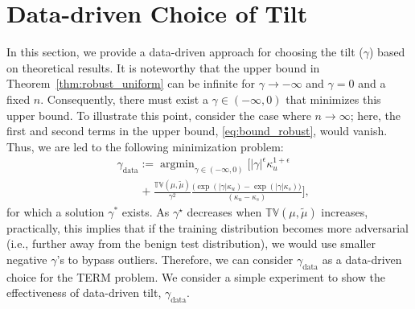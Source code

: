 \documentclass{article}
\theoremstyle{plain}
\theoremstyle{plain}
\theoremstyle{definition}
\theoremstyle{remark}
\newcommand{\todoa}[2][]{\todo[size=tiny,color=blue!20!white,#1]{GA: #2}\xspace}
\newcommand{\todor}[2][]{\todo[size=tiny,color=orange!20!white,#1]{GR: #2}\xspace}
\begin{document}
\section{Data-driven Choice of Tilt}\label{sec:Experiment}
In this section, we provide a data-driven approach for choosing the tilt ($\gamma$) based on theoretical results. It is noteworthy that the upper bound in Theorem~\ref{thm:robust_uniform} can be infinite for $\gamma\rightarrow -\infty$ and $\gamma=0$ and a fixed $n$. Consequently, there must exist a $\gamma\in(-\infty,0)$ that minimizes this upper bound. To illustrate this point, consider the case where $n\rightarrow\infty$; here, the first and second terms in the upper bound, \eqref{eq:bound_robust}, would vanish. Thus, we are led to the following minimization problem:
\begin{equation}\label{eq:gamma_data}
\begin{split}
&\gamma_{\text{data}}:=\mathop{\mathrm{arg} \min}_{\gamma\in(-\infty,0)}\Big[|\gamma|^{\epsilon}\kappa_u^{1+\epsilon}\\&\qquad+\frac{\mathbb{TV}(\mu,\tilde{\mu})}{\gamma^2 }\frac{\big(\exp(|\gamma|\kappa_u)-\exp(|\gamma|\kappa_s)\big)}{(\kappa_u-\kappa_s)}\Big],
\end{split}
\end{equation}
for which a solution $\gamma^*$ exists. %
As $\gamma^\star$ decreases when $\mathbb{TV}(\mu,\tilde{\mu})$ increases, practically, this implies that if the training distribution becomes more adversarial (i.e., further away from the benign test distribution), we would use smaller negative $\gamma$'s to bypass outliers. Therefore, we can consider $\gamma_{\text{data}}$ as a data-driven choice for the TERM problem. We consider a simple experiment to show the effectiveness of data-driven tilt, $\gamma_{\text{data}}$.
\end{document}
